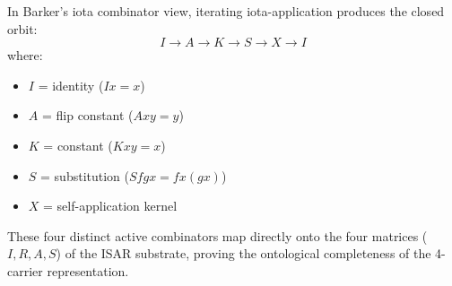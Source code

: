 In Barker's iota combinator view, iterating iota-application produces the closed orbit:
$$ I \to A \to K \to S \to X \to I $$
where:
\begin{itemize}
    \item $I$ = identity ($I x = x$)
    \item $A$ = flip constant ($A x y = y$)
    \item $K$ = constant ($K x y = x$)
    \item $S$ = substitution ($S f g x = f x (g x)$)
    \item $X$ = self-application kernel
\end{itemize}
These four distinct active combinators map directly onto the four matrices ($I, R, A, S$) of the ISAR substrate, proving the ontological completeness of the 4-carrier representation.
